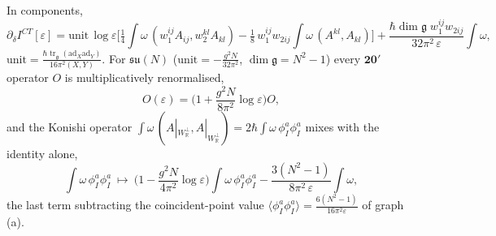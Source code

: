 \begin{remark}
In components,
\[
\partial_\delta I^{CT}[\varepsilon]=\mathrm{unit}\,\log\varepsilon\Big[\tfrac14\int\omega\,(w_1^{ij}A_{ij},w_2^{kl}A_{kl})-\tfrac18\,w_1^{ij}w_{2ij}\int\omega\,(A^{kl},A_{kl})\Big]+\frac{\hbar\dim\mathfrak g\;w_1^{ij}w_{2ij}}{32\pi^2\,\varepsilon}\int\omega,
\]
$\mathrm{unit}=\frac{\hbar\operatorname{tr}_{\mathfrak g}(\mathrm{ad}_X\mathrm{ad}_Y)}{16\pi^2(X,Y)}$. For $\mathfrak{su}(N)$ ($\mathrm{unit}=-\frac{g^2N}{32\pi^2}$, $\dim\mathfrak g=N^2-1$) every $\mathbf{20'}$ operator $O$ is multiplicatively renormalised,
\[
O(\varepsilon)=\Big(1+\frac{g^2N}{8\pi^2}\log\varepsilon\Big)O,
\]
and the Konishi operator $\int\omega\,(A|_{W_{\mathbb R}^\perp},A|_{W_{\mathbb R}^\perp})=2\hbar\int\omega\,\phi^a_I\phi^a_I$ mixes with the identity alone,
\[
\int\omega\,\phi^a_I\phi^a_I\ \longmapsto\ \Big(1-\frac{g^2N}{4\pi^2}\log\varepsilon\Big)\int\omega\,\phi^a_I\phi^a_I-\frac{3(N^2-1)}{8\pi^2\,\varepsilon}\int\omega,
\]
the last term subtracting the coincident-point value $\langle\phi^a_I\phi^a_I\rangle=\frac{6(N^2-1)}{16\pi^2\varepsilon}$ of graph (a).
\end{remark}
